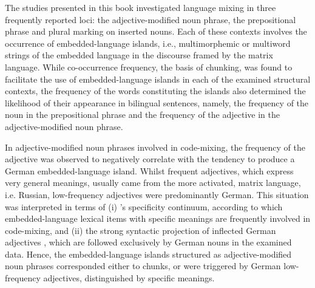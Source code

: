 The studies presented in this book investigated language mixing in three frequently reported loci: the adjective-modified noun phrase, the prepositional phrase and plural marking on inserted nouns. Each of these contexts involves the occurrence of embedded-language islands, i.e., multimorphemic or multiword strings of the embedded language in the discourse framed by the matrix language. While co-occurrence frequency, the basis of chunking, was found to facilitate the use of embedded-language islands in each of the examined structural contexts, the frequency of the words constituting the islands also determined the likelihood of their appearance in bilingual sentences, namely, the frequency of the noun in the prepositional phrase and the frequency of the adjective in the adjective-modified noun phrase. 

In adjective-modified noun phrases involved in code-mixing, the frequency of the adjective was observed to negatively correlate with the tendency to produce a German embedded-language island. Whilst frequent adjectives, which express very general meanings, usually came from the more activated, matrix language, i.e. Russian, low-frequency adjectives were predominantly German. This situation was interpreted in terms of (i) \citeauthor{backus-2001}'s specificity continuum, according to which embedded-language lexical items with specific meanings are frequently involved in code-mixing, and (ii) the strong syntactic projection of inflected German adjectives \citep{auer_projection_2005,auer_syntax_2007}, which are followed exclusively by German nouns in the examined data. Hence, the embedded-language islands structured as adjective-modified noun phrases corresponded either to chunks, or were triggered by German low-frequency adjectives, distinguished by specific meanings. 

